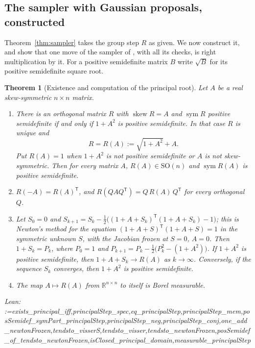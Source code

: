 \documentclass[11pt]{amsart}
\makeatletter
\newtheorem{theorem}{Theorem}[section]
\theoremstyle{definition}
\theoremstyle{remark}
\newcommand{\@leanlist}[1]{\def\@leansep{}\@for\@leanname:=#1\do{\@leansep
  \texttt{\expandafter\detokenize\expandafter{\@leanname}}\def\@leansep{, }}}
\newcommand{\lean}[1]{\par\smallskip\noindent
  {\footnotesize\normalfont\raggedright\textsf{Lean:} \@leanlist{#1}\par}}
\newcommand{\R}{\mathbb{R}}
\newcommand{\SO}{\mathrm{SO}}
\newcommand{\sym}{\operatorname{sym}}
\newcommand{\skw}{\operatorname{skew}}
\newcommand{\transp}{^{\mathsf T}}
\makeatother
\begin{document}
\subsection{The sampler with Gaussian proposals, constructed}\label{sec:construct}
Theorem~\ref{thm:sampler} takes the group step $R$ as given.  We now construct it, and show that
one move of the sampler of \cite{ZHG}, with all its checks, is right multiplication by it.  For a
positive semidefinite matrix $B$ write $\sqrt B$ for its positive semidefinite square root.

\begin{theorem}[Existence and computation of the principal root]\label{thm:principal-exists}
Let $A$ be a real skew-symmetric $n\times n$ matrix.
\begin{enumerate}
\item[(a)] There is an orthogonal matrix $R$ with $\skw R=A$ and $\sym R$ positive semidefinite
if and only if $1+A^2$ is positive semidefinite.  In that case $R$ is unique and
\[
  R=R(A):=\sqrt{1+A^2}+A .
\]
Put $R(A)=1$ when $1+A^2$ is not positive semidefinite or $A$ is not skew-symmetric.  Then for
every matrix $A$, $R(A)\in\SO(n)$ and $\sym R(A)$ is positive semidefinite.
\item[(b)] $R(-A)=R(A)\transp$, and $R(QAQ\transp)=Q\,R(A)\,Q\transp$ for every orthogonal $Q$.
\item[(c)] Let $S_0=0$ and $S_{k+1}=S_k-\tfrac12\bigl((1+A+S_k)\transp(1+A+S_k)-1\bigr)$; this is
Newton's method for the equation $(1+A+S)\transp(1+A+S)=1$ in the symmetric unknown $S$, with
the Jacobian frozen at $S=0$, $A=0$.  Then $1+S_k=P_k$, where $P_0=1$ and
$P_{k+1}=P_k-\tfrac12\bigl(P_k^2-(1+A^2)\bigr)$.  If $1+A^2$ is positive semidefinite, then
$1+A+S_k\to R(A)$ as $k\to\infty$.  Conversely, if the sequence $S_k$ converges, then $1+A^2$ is
positive semidefinite.
\item[(d)] The map $A\mapsto R(A)$ from $\R^{n\times n}$ to itself is Borel measurable.
\end{enumerate}
\lean{exists_principal_iff,principalStep_spec,eq_principalStep,principalStep_mem,posSemidef_symPart_principalStep,principalStep_neg,principalStep_conj,one_add_newtonFrozen,tendsto_visserS,tendsto_visser,tendsto_newtonFrozen,posSemidef_of_tendsto_newtonFrozen,isClosed_principal_domain,measurable_principalStep}
\end{theorem}
\end{document}
